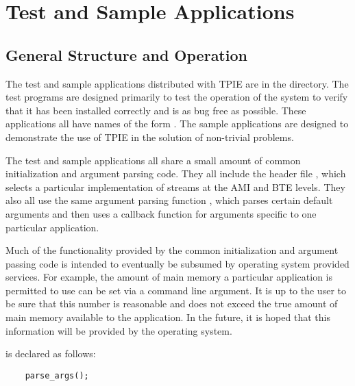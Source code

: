 \chapter{Test and Sample Applications}

\section{General Structure and Operation}

The test and sample applications distributed with TPIE are in the
 directory.  The test programs are designed primarily to
test the operation of the system to verify that it has been installed
correctly and is as bug free as possible.  These applications all have
names of the form .  The sample applications are designed
to demonstrate the use of TPIE in the solution of non-trivial
problems.

The test and sample applications all share a small amount of common
initialization and argument parsing code.  They all include the header file
, which selects a particular implementation of streams
at the AMI and BTE levels. They also all use the same argument parsing
function , which parses certain default arguments and
then uses a callback function for arguments specific to one particular
application.

Much of the functionality provided by the common initialization and
argument passing code is intended to eventually be subsumed by
operating system provided services.  For example, the amount of main
memory a particular application is permitted to use can be set via a
command line argument.  It is up to the user to be sure that this
number is reasonable and does not exceed the true amount of main
memory available to the application.  In the future, it is hoped that
this information will be provided by the operating system.

 is declared as follows:

\begin{verbatim}
    parse_args();
\end{verbatim}



